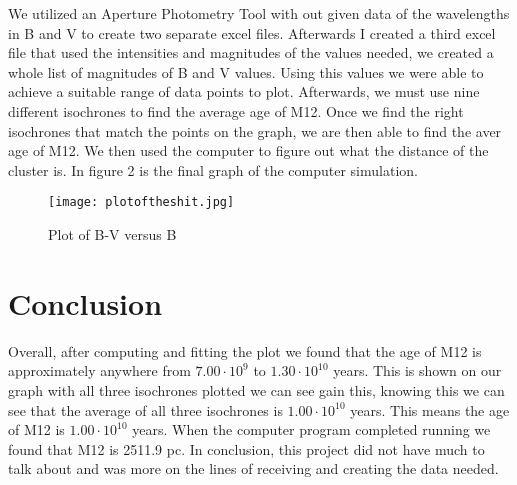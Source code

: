 \documentclass[%
 reprint,
 amsmath,amssymb,
 aps,
]{revtex4-1}
\begin{document}
We utilized an Aperture Photometry Tool with out given data of the wavelengths in B and V to create two separate excel files. Afterwards I created a third excel file that used the intensities and magnitudes of the values needed, we created a whole list of magnitudes of B and V values. Using this values we were able to achieve a suitable range of data points to plot. Afterwards, we must use nine different isochrones to find the average age of M12. Once we find the right isochrones that match the points on the graph, we are then able to find the aver age of M12. We then used the computer to figure out what the distance of the cluster is. In figure 2 is the final graph of the computer simulation.

\begin{figure}[htbp] %
   \centering
   \texttt{[image: plotoftheshit.jpg]} 
   \caption{Plot of B-V versus B}
   \label{fig:example}
\end{figure}


\section{\label{sec:level3}Conclusion}

Overall, after computing and fitting the plot we found that the age of M12 is approximately anywhere from $7.00\cdot10^{9}$ to $1.30\cdot10^{10}$ years. This is shown on our graph with all three isochrones plotted we can see gain this, knowing this we can see that the average of all three isochrones is $1.00\cdot10^{10}$ years. This means the age of M12 is $1.00\cdot10^{10}$ years. When the computer program completed running we found that M12 is 2511.9 pc. In conclusion, this project did not have much to talk about and was more on the lines of receiving and creating the data needed.
\end{document}
